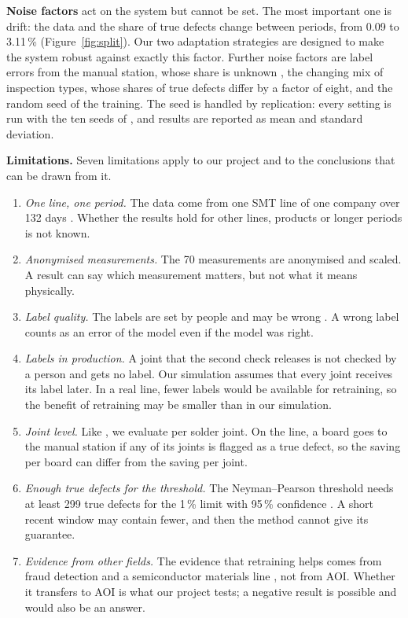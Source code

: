 \documentclass[11pt,a4paper]{article}
\begin{document}
\textbf{Noise factors} act on the system but cannot be set. The most important one is drift: the data and the share of true defects change between periods, from 0.09 to 3.11\,\% (Figure~\ref{fig:split}). Our two adaptation strategies are designed to make the system robust against exactly this factor. Further noise factors are label errors from the manual station, whose share is unknown \cite{pfab2024}, the changing mix of inspection types, whose shares of true defects differ by a factor of eight, and the random seed of the training. The seed is handled by replication: every setting is run with the ten seeds of \cite{pfab2025}, and results are reported as mean and standard deviation.

\textbf{Limitations.} Seven limitations apply to our project and to the conclusions that can be drawn from it.
\begin{enumerate}
  \item \textit{One line, one period.} The data come from one SMT line of one company over 132 days \cite{pfab2024}. Whether the results hold for other lines, products or longer periods is not known.
  \item \textit{Anonymised measurements.} The 70 measurements are anonymised and scaled. A result can say which measurement matters, but not what it means physically.
  \item \textit{Label quality.} The labels are set by people and may be wrong \cite{pfab2024}. A wrong label counts as an error of the model even if the model was right.
  \item \textit{Labels in production.} A joint that the second check releases is not checked by a person and gets no label. Our simulation assumes that every joint receives its label later. In a real line, fewer labels would be available for retraining, so the benefit of retraining may be smaller than in our simulation.
  \item \textit{Joint level.} Like \cite{pfab2025}, we evaluate per solder joint. On the line, a board goes to the manual station if any of its joints is flagged as a true defect, so the saving per board can differ from the saving per joint.
  \item \textit{Enough true defects for the threshold.} The Neyman--Pearson threshold needs at least 299 true defects for the 1\,\% limit with 95\,\% confidence \cite{tong2018}. A short recent window may contain fewer, and then the method cannot give its guarantee.
  \item \textit{Evidence from other fields.} The evidence that retraining helps comes from fraud detection and a semiconductor materials line \cite{dalpozzolo2018,gao2026}, not from AOI. Whether it transfers to AOI is what our project tests; a negative result is possible and would also be an answer.
\end{enumerate}
\end{document}

